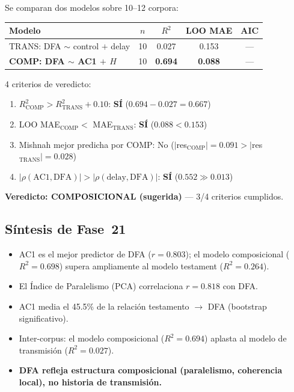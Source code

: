\documentclass[12pt,a4paper]{article}
\newcommand{\val}[1]{\textcolor{hlcolor}{\textbf{#1}}}
\begin{document}
Se comparan dos modelos sobre 10--12 corpora:
\begin{center}\small
\begin{tabular}{lcccc}
\toprule
Modelo & $n$ & $R^2$ & LOO MAE & AIC \\
\midrule
TRANS: DFA $\sim$ control $+$ delay & 10 & 0.027 & 0.153 & --- \\
\textbf{COMP: DFA $\sim$ AC1 $+$ $H$} & 10 & \val{0.694} & \val{0.088} & --- \\
\bottomrule
\end{tabular}
\end{center}
4 criterios de veredicto:
\begin{enumerate}[leftmargin=2em]
\item $R^2_{\text{COMP}} > R^2_{\text{TRANS}} + 0.10$: \textbf{S\'I} ($0.694 - 0.027 = 0.667$)
\item LOO MAE$_{\text{COMP}} <$ MAE$_{\text{TRANS}}$: \textbf{S\'I} ($0.088 < 0.153$)
\item Mishnah mejor predicha por COMP: No ($|$res$_{\text{COMP}}| = 0.091 > |$res$_{\text{TRANS}}| = 0.028$)
\item $|\rho(\text{AC1}, \text{DFA})| > |\rho(\text{delay}, \text{DFA})|$: \textbf{S\'I} ($0.552 \gg 0.013$)
\end{enumerate}
\textbf{Veredicto: COMPOSICIONAL (sugerida)} --- 3/4 criterios cumplidos.

\subsection{S\'intesis de Fase~21}

\begin{itemize}[leftmargin=2em]
\item AC1 es el mejor predictor de DFA ($r = 0.803$); el modelo composicional
      ($R^2 = 0.698$) supera ampliamente al modelo testament ($R^2 = 0.264$).
\item El \'Indice de Paralelismo (PCA) correlaciona $r = 0.818$ con DFA.
\item AC1 media el 45.5\% de la relaci\'on testamento $\to$ DFA (bootstrap significativo).
\item Inter-corpus: el modelo composicional ($R^2 = 0.694$) aplasta al modelo
      de transmisi\'on ($R^2 = 0.027$).
\item \textbf{DFA refleja estructura composicional (paralelismo, coherencia local),
      no historia de transmisi\'on.}
\end{itemize}
\end{document}
